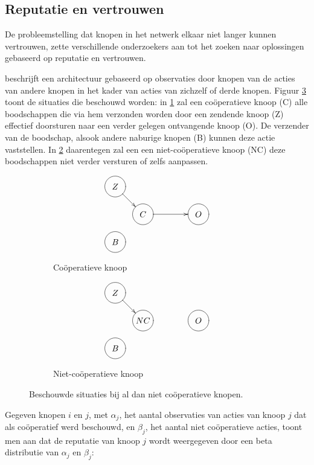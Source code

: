 \subsection{Reputatie en vertrouwen}
\label{subsection:reputation}

De probleemstelling dat knopen in het netwerk elkaar niet langer kunnen
vertrouwen, zette verschillende onderzoekers aan tot het zoeken naar
oplossingen gebaseerd op reputatie en vertrouwen.

\cite{ganeriwal2008reputation} beschrijft een architectuur gebaseerd op
observaties door knopen van de acties van andere knopen in het kader van acties
van zichzelf of derde knopen. Figuur \ref{fig:reputation-cooperation} toont de
situaties die beschouwd worden: in \ref{fig:reputation-cooperative-node} zal
een co\"operatieve knoop (C) alle boodschappen die via hem verzonden worden
door een zendende knoop (Z) effectief doorsturen naar een verder gelegen
ontvangende knoop (O). De verzender van de boodschap, alsook andere naburige
knopen (B) kunnen deze actie vaststellen. In
\ref{fig:reputation-uncooperative-node} daarentegen zal een een
niet-co\"operatieve knoop (NC) deze boodschappen niet verder versturen of zelfs
aanpassen.

\begin{figure}
\centering
\begin{subfigure}{.49\textwidth}
\centering
\[ \entrymodifiers={-=+++[o][F-]}
 \xymatrix@!=0.75pc {
  Z \ar[dr] & *{}       & *{} & *{} \\
  *{}       & C \ar[rr] & *{} & O   \\
  B         & *{}       & *{} & *{} \\
 }
\]
\caption{Co\"operatieve knoop}
\label{fig:reputation-cooperative-node}
\end{subfigure}
\begin{subfigure}{.49\textwidth}
\centering
\[ \entrymodifiers={-=+++[o][F-]}
 \xymatrix@!=0.75pc {
  Z \ar[dr] & *{}       & *{} & *{} \\
  *{}       & NC        & *{} & O   \\
  B         & *{}       & *{} & *{} \\
 }
\]
\caption{Niet-co\"operatieve knoop}
\label{fig:reputation-uncooperative-node}
\end{subfigure}
\caption{Beschouwde situaties bij al dan niet co\"operatieve knopen.}
\label{fig:reputation-cooperation}
\end{figure}

Gegeven knopen $i$ en $j$, met $\alpha_j$, het aantal observaties van acties van
knoop $j$ dat als co\"operatief werd beschouwd, en $\beta_j$, het aantal niet
co\"operatieve acties, toont men aan dat de reputatie van knoop $j$ wordt
weergegeven door een beta distributie van $\alpha_j$ en $\beta_j$:

